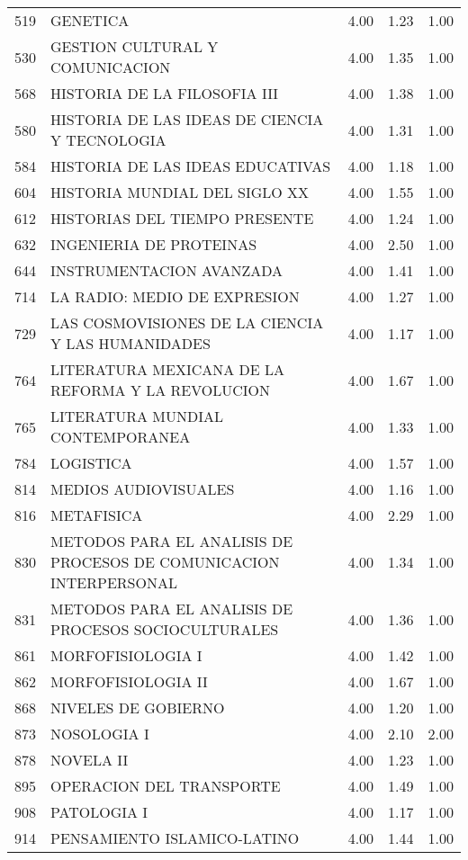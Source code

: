 \begin{table}[ht]
\begin{tabular}{rlrrr}
  519 & GENETICA & 4.00 & 1.23 & 1.00 \\ 
  530 & GESTION CULTURAL Y COMUNICACION & 4.00 & 1.35 & 1.00 \\ 
  568 & HISTORIA DE LA FILOSOFIA III & 4.00 & 1.38 & 1.00 \\ 
  580 & HISTORIA DE LAS IDEAS DE CIENCIA Y TECNOLOGIA & 4.00 & 1.31 & 1.00 \\ 
  584 & HISTORIA DE LAS IDEAS EDUCATIVAS & 4.00 & 1.18 & 1.00 \\ 
  604 & HISTORIA MUNDIAL DEL SIGLO XX & 4.00 & 1.55 & 1.00 \\ 
  612 & HISTORIAS DEL TIEMPO PRESENTE & 4.00 & 1.24 & 1.00 \\ 
  632 & INGENIERIA DE PROTEINAS & 4.00 & 2.50 & 1.00 \\ 
  644 & INSTRUMENTACION AVANZADA & 4.00 & 1.41 & 1.00 \\ 
  714 & LA RADIO: MEDIO DE EXPRESION & 4.00 & 1.27 & 1.00 \\ 
  729 & LAS COSMOVISIONES DE LA CIENCIA Y LAS HUMANIDADES & 4.00 & 1.17 & 1.00 \\ 
  764 & LITERATURA MEXICANA DE LA REFORMA Y LA REVOLUCION & 4.00 & 1.67 & 1.00 \\ 
  765 & LITERATURA MUNDIAL CONTEMPORANEA & 4.00 & 1.33 & 1.00 \\ 
  784 & LOGISTICA & 4.00 & 1.57 & 1.00 \\ 
  814 & MEDIOS AUDIOVISUALES & 4.00 & 1.16 & 1.00 \\ 
  816 & METAFISICA & 4.00 & 2.29 & 1.00 \\ 
  830 & METODOS PARA EL ANALISIS DE PROCESOS DE COMUNICACION INTERPERSONAL & 4.00 & 1.34 & 1.00 \\ 
  831 & METODOS PARA EL ANALISIS DE PROCESOS SOCIOCULTURALES & 4.00 & 1.36 & 1.00 \\ 
  861 & MORFOFISIOLOGIA I & 4.00 & 1.42 & 1.00 \\ 
  862 & MORFOFISIOLOGIA II & 4.00 & 1.67 & 1.00 \\ 
  868 & NIVELES DE GOBIERNO & 4.00 & 1.20 & 1.00 \\ 
  873 & NOSOLOGIA I & 4.00 & 2.10 & 2.00 \\ 
  878 & NOVELA II & 4.00 & 1.23 & 1.00 \\ 
  895 & OPERACION DEL TRANSPORTE & 4.00 & 1.49 & 1.00 \\ 
  908 & PATOLOGIA I & 4.00 & 1.17 & 1.00 \\ 
  914 & PENSAMIENTO ISLAMICO-LATINO & 4.00 & 1.44 & 1.00 \\ 

\end{tabular}
\end{table}
